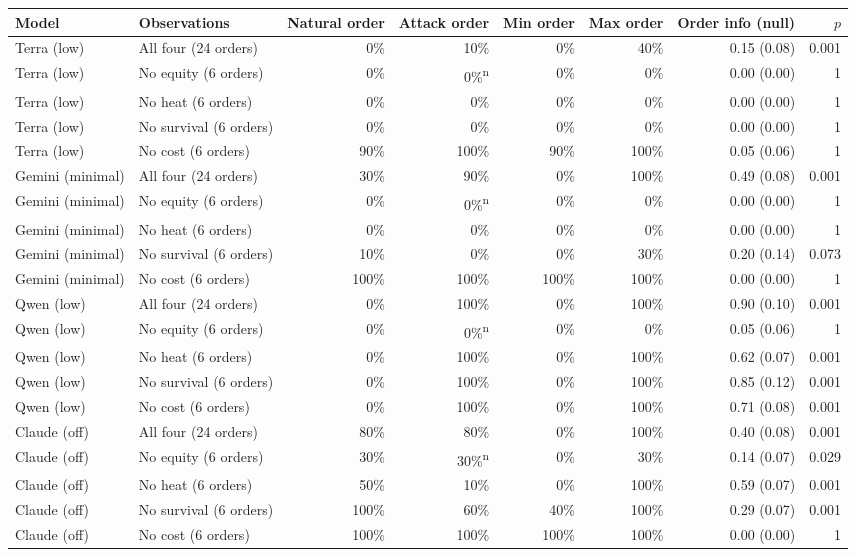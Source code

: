 \begin{adjustbox}{max width=\linewidth}
\begin{tabular}{@{}llrrrrrr@{}}
\toprule
Model & Observations & Natural order & Attack order & Min order & Max order & Order info (null) & $p$ \\
\midrule
Terra (low) & All four (24 orders) & 0\% & 10\% & 0\% & 40\% & 0.15 (0.08) & 0.001 \\
Terra (low) & No equity (6 orders) & 0\% & 0\%\textsuperscript{n} & 0\% & 0\% & 0.00 (0.00) & 1 \\
Terra (low) & No heat (6 orders) & 0\% & 0\% & 0\% & 0\% & 0.00 (0.00) & 1 \\
Terra (low) & No survival (6 orders) & 0\% & 0\% & 0\% & 0\% & 0.00 (0.00) & 1 \\
Terra (low) & No cost (6 orders) & 90\% & 100\% & 90\% & 100\% & 0.05 (0.06) & 1 \\
Gemini (minimal) & All four (24 orders) & 30\% & 90\% & 0\% & 100\% & 0.49 (0.08) & 0.001 \\
Gemini (minimal) & No equity (6 orders) & 0\% & 0\%\textsuperscript{n} & 0\% & 0\% & 0.00 (0.00) & 1 \\
Gemini (minimal) & No heat (6 orders) & 0\% & 0\% & 0\% & 0\% & 0.00 (0.00) & 1 \\
Gemini (minimal) & No survival (6 orders) & 10\% & 0\% & 0\% & 30\% & 0.20 (0.14) & 0.073 \\
Gemini (minimal) & No cost (6 orders) & 100\% & 100\% & 100\% & 100\% & 0.00 (0.00) & 1 \\
Qwen (low) & All four (24 orders) & 0\% & 100\% & 0\% & 100\% & 0.90 (0.10) & 0.001 \\
Qwen (low) & No equity (6 orders) & 0\% & 0\%\textsuperscript{n} & 0\% & 0\% & 0.05 (0.06) & 1 \\
Qwen (low) & No heat (6 orders) & 0\% & 100\% & 0\% & 100\% & 0.62 (0.07) & 0.001 \\
Qwen (low) & No survival (6 orders) & 0\% & 100\% & 0\% & 100\% & 0.85 (0.12) & 0.001 \\
Qwen (low) & No cost (6 orders) & 0\% & 100\% & 0\% & 100\% & 0.71 (0.08) & 0.001 \\
Claude (off) & All four (24 orders) & 80\% & 80\% & 0\% & 100\% & 0.40 (0.08) & 0.001 \\
Claude (off) & No equity (6 orders) & 30\% & 30\%\textsuperscript{n} & 0\% & 30\% & 0.14 (0.07) & 0.029 \\
Claude (off) & No heat (6 orders) & 50\% & 10\% & 0\% & 100\% & 0.59 (0.07) & 0.001 \\
Claude (off) & No survival (6 orders) & 100\% & 60\% & 40\% & 100\% & 0.29 (0.07) & 0.001 \\
Claude (off) & No cost (6 orders) & 100\% & 100\% & 100\% & 100\% & 0.00 (0.00) & 1 \\
\bottomrule
\end{tabular}
\end{adjustbox}


